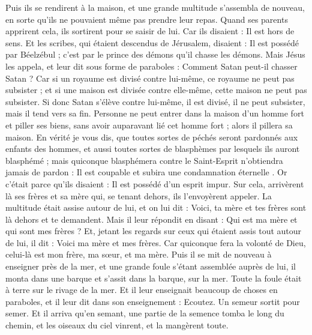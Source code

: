 \begin{multicols}{2}
Puis ils se rendirent à la maison, et une grande multitude s'assembla de nouveau, en sorte qu'ils ne pouvaient même pas prendre leur repas.
Quand ses parents apprirent cela, ils sortirent pour se saisir de lui. Car ils disaient : Il est hors de sens.
Et les scribes, qui étaient descendus de Jérusalem, disaient : Il est possédé par Béelzébul ; c'est par le prince des démons qu'il chasse les démons.
Mais Jésus les appela, et leur dit sous forme de paraboles : Comment Satan peut-il chasser Satan ?
Car si un royaume est divisé contre lui-même, ce royaume ne peut pas subsister ;
et si une maison est divisée contre elle-même, cette maison ne peut pas subsister.
Si donc Satan s'élève contre lui-même, il est divisé, il ne peut subsister, mais il tend vers sa fin.
Personne ne peut entrer dans la maison d'un homme fort et piller ses biens, sans avoir auparavant lié cet homme fort ; alors il pillera sa maison.
En vérité je vous dis, que toutes sortes de péchés seront pardonnés aux enfants des hommes, et aussi toutes sortes de blasphèmes par lesquels ils auront blasphémé ;
mais quiconque blasphémera contre le Saint-Esprit n'obtiendra jamais de pardon : Il est coupable et subira une condamnation éternelle .
Or c'était parce qu'ils disaient : Il est possédé d'un esprit impur.
Sur cela, arrivèrent là ses frères et sa mère qui, se tenant dehors, ils l'envoyèrent appeler. La multitude était assise autour de lui,
et on lui dit : Voici, ta mère et tes frères sont là dehors et te demandent.
Mais il leur répondit en disant : Qui est ma mère et qui sont mes frères ?
Et, jetant les regards sur ceux qui étaient assis tout autour de lui, il dit : Voici ma mère et mes frères.
Car quiconque fera la volonté de Dieu, celui-là est mon frère, ma sœur, et ma mère.
\VerseOne{}Puis il se mit de nouveau à enseigner près de la mer, et une grande foule s'étant assemblée auprès de lui, il monta dans une barque et s'assit dans la barque, sur la mer. Toute la foule était à terre sur le rivage de la mer.
Et il leur enseignait beaucoup de choses en paraboles, et il leur dit dans son enseignement :
Ecoutez. Un semeur sortit pour semer.
Et il arriva qu'en semant, une partie de la semence tomba le long du chemin, et les oiseaux du ciel vinrent, et la mangèrent toute.

\end{multicols}

